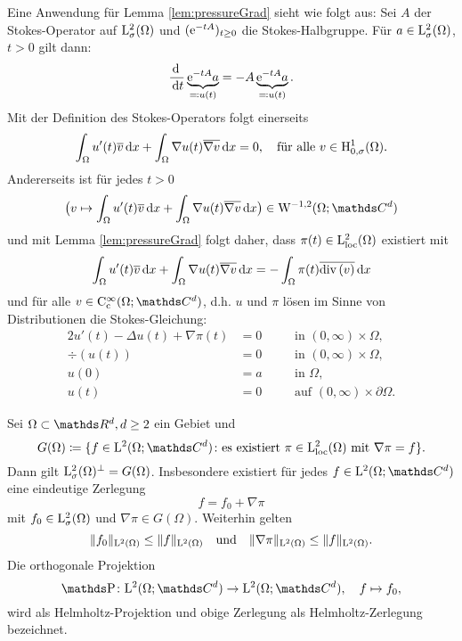Eine Anwendung für Lemma \ref{lem:pressureGrad} sieht wie folgt aus:
Sei $A$ der Stokes-Operator auf $\mathrm{L}^2_\sigma(\Omega)$ und $(\mathrm{e}^{-tA})_{t \geq 0}$ die Stokes-Halbgruppe.
Für $a \in \mathrm{L}^2_\sigma(\Omega)$, $t > 0$ gilt dann:
$$
\frac{\, {\operatorname{d}\!{\ }}}{\, {\operatorname{d}\!{t}}} \underbrace{\mathrm{e}^{-tA} a}_{\eqqcolon u(t)} = - A \underbrace{\mathrm{e}^{-t A} a}_{\eqqcolon u(t)}.
$$
Mit der Definition des Stokes-Operators folgt einerseits
$$
\int_\Omega u'(t) \overline v \, {\operatorname{d}\!{x}} + \int_\Omega \nabla u(t)  \overline{\nabla v} \, {\operatorname{d}\!{x}}= 0, \quad\text{für alle } v \in \mathrm{H}^1_{0,\sigma}(\Omega).
$$
Andererseits ist für jedes $t > 0$ 
$$
\big( v \mapsto \int_\Omega u'(t) \overline v \d x + \int_\Omega \nabla u(t) \overline{\nabla v} \d x \big) \in \WW^{-1,2}(\Omega; \C^d)
$$
und mit Lemma \ref{lem:pressureGrad} folgt daher, dass $\pi(t) \in \mathrm{L}^2_{\operatorname{loc}}(\Omega)$ existiert mit
$$
\int_\Omega u'(t) \overline v \, {\operatorname{d}\!{x}} + \int_\Omega \nabla u(t) \overline{\nabla v} \, {\operatorname{d}\!{x}} = -\int_\Omega \pi(t) \overline{\mathrm{div\,} (v)} \, {\operatorname{d}\!{x}}
$$
und für alle $v \in \CC_{\cc}^\infty(\Omega; \C^d)$, d.h. $u$ und $\pi$ lösen im Sinne von Distributionen die Stokes-Gleichung:
\begin{alignat*}{2}
  u'(t) -\Delta u(t) + \nabla \pi(t) &= 0 &&\quad\text{in } (0,\infty) \times \Omega, \\
  \div(u(t)) &= 0 &&\quad\text{in } (0,\infty) \times \Omega, \\
  u(0) &= a &&\quad\text{in }  \Omega, \\
  u(t)  &= 0 &&\quad\text{auf } (0,\infty) \times \partial\Omega.
\end{alignat*}

\begin{thm}
  Sei $\Omega \subset \R^d, d \geq 2$ ein Gebiet und
  $$
  G(\Omega) \coloneqq \{ f \in \Ell^2(\Omega; \C^d) \colon \text{es existiert } \pi \in \Ell^2_{\loc}(\Omega) \text{ mit } \nabla \pi = f \}.
  $$
  Dann gilt $\mathrm{L}^2_\sigma(\Omega)^\perp = G(\Omega)$.
  Insbesondere existiert für jedes $f \in \Ell^2(\Omega; \C^d)$ eine eindeutige Zerlegung
  $$
  f = f_0 + \nabla \pi
  $$
  mit $f_0 \in \mathrm{L}^2_\sigma(\Omega)$ und $\nabla\pi \in G(\Omega)$.
  Weiterhin gelten
  $$
  \|f_0\|_{\mathrm{L}^2(\Omega)} \leq \|f\|_{\mathrm{L}^2(\Omega)} \quad\text{und}\quad \|\nabla\pi \|_{\mathrm{L}^2(\Omega)} \leq \|f\|_{\mathrm{L}^2(\Omega)}.
  $$
  Die orthogonale Projektion 
  $$
  \PP \colon \Ell^2(\Omega; \C^d) \to \Ell^2(\Omega; \C^d), \quad f \mapsto f_0,
  $$
  wird als Helmholtz-Projektion und obige Zerlegung als Helmholtz-Zerlegung bezeichnet.
\end{thm}

